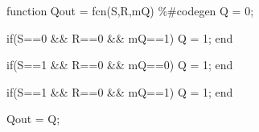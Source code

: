 
\begin{mylisting}[language=c,caption=SRFFモジュール,label=hurokuC_SRFF]

function Qout = fcn(S,R,mQ)
\%\#codegen
Q = 0;

if(S==0 \&\& R==0 \&\& mQ==1)
    Q = 1;
end

if(S==1 \&\& R==0 \&\& mQ==0)
    Q = 1;
end

if(S==1 \&\& R==0 \&\& mQ==1)
    Q = 1;
end

Qout = Q;

\end{mylisting}

